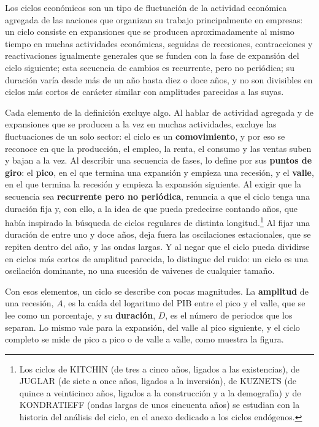 \documentclass[10pt,a4paper]{article}
\newcounter{anexo}
\begin{document}
\begin{cita}
Los ciclos económicos son un tipo de fluctuación de la actividad económica agregada de las naciones que organizan su trabajo principalmente en empresas: un ciclo consiste en expansiones que se producen aproximadamente al mismo tiempo en muchas actividades económicas, seguidas de recesiones, contracciones y reactivaciones igualmente generales que se funden con la fase de expansión del ciclo siguiente; esta secuencia de cambios es recurrente, pero no periódica; su duración varía desde más de un año hasta diez o doce años, y no son divisibles en ciclos más cortos de carácter similar con amplitudes parecidas a las suyas.
\end{cita}

Cada elemento de la definición excluye algo. Al hablar de actividad agregada y de expansiones que se producen a la vez en muchas actividades, excluye las fluctuaciones de un solo sector: el ciclo es un \textbf{comovimiento}, y por eso se reconoce en que la producción, el empleo, la renta, el consumo y las ventas suben y bajan a la vez. Al describir una secuencia de fases, lo define por sus \textbf{puntos de giro}: el \textbf{pico}, en el que termina una expansión y empieza una recesión, y el \textbf{valle}, en el que termina la recesión y empieza la expansión siguiente. Al exigir que la secuencia sea \textbf{recurrente pero no periódica}, renuncia a que el ciclo tenga una duración fija y, con ello, a la idea de que pueda predecirse contando años, que había inspirado la búsqueda de ciclos regulares de distinta longitud.\footnote{%
    Los ciclos de KITCHIN (de tres a cinco años, ligados a las existencias), de JUGLAR (de siete a once años, ligados a la inversión), de KUZNETS (de quince a veinticinco años, ligados a la construcción y a la demografía) y de KONDRATIEFF (ondas largas de unos cincuenta años) se estudian con la historia del análisis del ciclo, en el anexo dedicado a los ciclos endógenos.
}
Al fijar una duración de entre uno y doce años, deja fuera las oscilaciones estacionales, que se repiten dentro del año, y las ondas largas. Y al negar que el ciclo pueda dividirse en ciclos más cortos de amplitud parecida, lo distingue del ruido: un ciclo es una oscilación dominante, no una sucesión de vaivenes de cualquier tamaño.

Con esos elementos, un ciclo se describe con pocas magnitudes. La \textbf{amplitud} de una recesión, $A$, es la caída del logaritmo del PIB entre el pico y el valle, que se lee como un porcentaje, y su \textbf{duración}, $D$, es el número de periodos que los separan. Lo mismo vale para la expansión, del valle al pico siguiente, y el ciclo completo se mide de pico a pico o de valle a valle, como muestra la figura.
\end{document}
